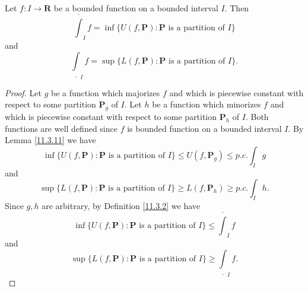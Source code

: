 \begin{proposition}\label{11.3.12}
    Let \(f : I \to \mathbf{R}\) be a bounded function on a bounded interval \(I\).
    Then
    \[
        \overline{\int}_I f = \inf\{U(f, \mathbf{P}) : \mathbf{P} \text{ is a partition of } I\}
    \]
    and
    \[
        \underline{\int}_I f = \sup\{L(f, \mathbf{P}) : \mathbf{P} \text{ is a partition of } I\}.
    \]
\end{proposition}

\begin{proof}
    Let \(g\) be a function which majorizes \(f\) and which is piecewise constant with respect to some partition \(\mathbf{P}_g\) of \(I\).
    Let \(h\) be a function which minorizes \(f\) and which is piecewise constant with respect to some partition \(\mathbf{P}_h\) of \(I\).
    Both functions are well defined since \(f\) is bounded function on a bounded interval \(I\).
    By Lemma \ref{11.3.11} we have
    \[
        \inf\big\{U(f, \mathbf{P}) : \mathbf{P} \text{ is a partition of } I\big\} \leq U(f, \mathbf{P}_g) \leq p.c. \int_I g
    \]
    and
    \[
        \sup\big\{L(f, \mathbf{P}) : \mathbf{P} \text{ is a partition of } I\big\} \geq L(f, \mathbf{P}_h) \geq p.c. \int_I h.
    \]
    Since \(g, h\) are arbitrary, by Definition \ref{11.3.2} we have
    \[
        \inf\big\{U(f, \mathbf{P}) : \mathbf{P} \text{ is a partition of } I\big\} \leq \overline{\int}_I f
    \]
    and
    \[
        \sup\big\{L(f, \mathbf{P}) : \mathbf{P} \text{ is a partition of } I\big\} \geq \underline{\int}_I f.
    \]


\end{proof}
